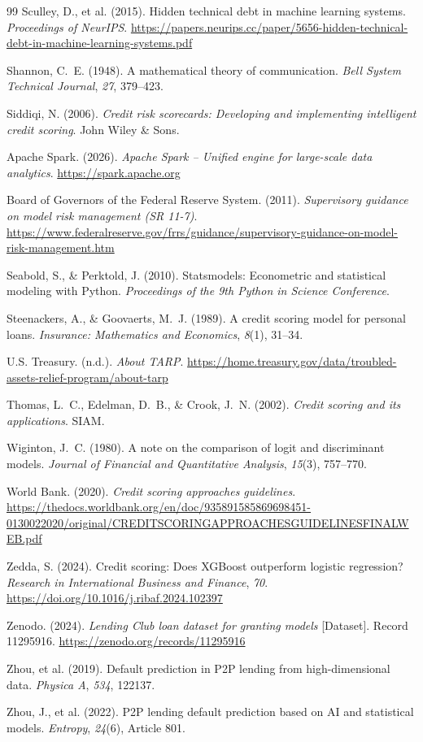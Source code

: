 \documentclass[12pt,a4paper]{report}
\begin{document}
\begin{thebibliography}{99}
Sculley, D., et al. (2015). Hidden technical debt in machine learning systems. \textit{Proceedings of NeurIPS}. \url{https://papers.neurips.cc/paper/5656-hidden-technical-debt-in-machine-learning-systems.pdf}

Shannon, C.~E. (1948). A mathematical theory of communication. \textit{Bell System Technical Journal}, \textit{27}, 379--423.

Siddiqi, N. (2006). \textit{Credit risk scorecards: Developing and implementing intelligent credit scoring}. John Wiley \& Sons.

Apache Spark. (2026). \textit{Apache Spark -- Unified engine for large-scale data analytics}. \url{https://spark.apache.org}

Board of Governors of the Federal Reserve System. (2011). \textit{Supervisory guidance on model risk management (SR 11-7)}. \url{https://www.federalreserve.gov/frrs/guidance/supervisory-guidance-on-model-risk-management.htm}

Seabold, S., \& Perktold, J. (2010). Statsmodels: Econometric and statistical modeling with Python. \textit{Proceedings of the 9th Python in Science Conference}.

Steenackers, A., \& Goovaerts, M.~J. (1989). A credit scoring model for personal loans. \textit{Insurance: Mathematics and Economics}, \textit{8}(1), 31--34.

U.S. Treasury. (n.d.). \textit{About TARP}. \url{https://home.treasury.gov/data/troubled-assets-relief-program/about-tarp}

Thomas, L.~C., Edelman, D.~B., \& Crook, J.~N. (2002). \textit{Credit scoring and its applications}. SIAM.

Wiginton, J.~C. (1980). A note on the comparison of logit and discriminant models. \textit{Journal of Financial and Quantitative Analysis}, \textit{15}(3), 757--770.

World Bank. (2020). \textit{Credit scoring approaches guidelines}. \url{https://thedocs.worldbank.org/en/doc/935891585869698451-0130022020/original/CREDITSCORINGAPPROACHESGUIDELINESFINALWEB.pdf}

Zedda, S. (2024). Credit scoring: Does XGBoost outperform logistic regression? \textit{Research in International Business and Finance}, \textit{70}. \url{https://doi.org/10.1016/j.ribaf.2024.102397}

Zenodo. (2024). \textit{Lending Club loan dataset for granting models} [Dataset]. Record 11295916. \url{https://zenodo.org/records/11295916}

Zhou, et al. (2019). Default prediction in P2P lending from high-dimensional data. \textit{Physica A}, \textit{534}, 122137.

Zhou, J., et al. (2022). P2P lending default prediction based on AI and statistical models. \textit{Entropy}, \textit{24}(6), Article 801.

\end{thebibliography}
\end{document}
